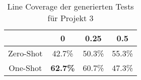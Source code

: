 \bgroup
\def\arraystretch{2}
\begin{table}[H]
	\vspace{.5cm}
	\centering		
	\begin{center}
		\begin{tabular}{|c||c|c|c|}
			\hline 
			& 0 & 0.25 & 0.5 \\
			\hline 
			\hline
			Zero-Shot & 42.7\% & 50.3\% & 55.3\% \\
			\hline
			One-Shot & \textbf{62.7\%} & 60.7\% & 47.3\% \\
			\hline
		\end{tabular} 
	\end{center}
	\caption{Line Coverage der generierten Tests für Projekt 3}
	\label{fig:line-3}
	\vspace{-.8cm}
\end{table}
\egroup